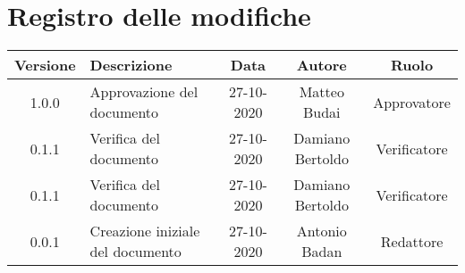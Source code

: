 \section*{Registro delle modifiche}

\begin{center}
	\begin{longtable}{|c|p{5cm}|c|c|c|}
	\hline
	\rowcolor{lighter-grayer}
	\textbf{Versione} & \textbf{Descrizione} & \textbf{Data} & \textbf{Autore} & \textbf{Ruolo} \\
	\hline
	\endfirsthead


	\hline
	1.0.0 & Approvazione del documento & 27-10-2020 & Matteo Budai & Approvatore \\
	\hline
	0.1.1 & Verifica del documento & 27-10-2020 & Damiano Bertoldo & Verificatore \\
    \hline
    0.1.1 & Verifica del documento & 27-10-2020 & Damiano Bertoldo & Verificatore \\
    \hline
    0.0.1 & Creazione iniziale del documento & 27-10-2020 & Antonio Badan & Redattore \\
    \hline
	\end{longtable}
\end{center}